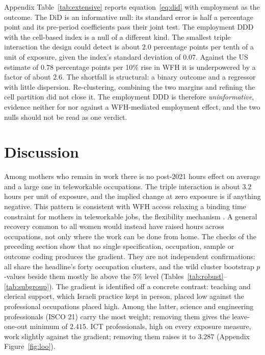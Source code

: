 \documentclass[12pt,a4paper]{article}
\begin{document}
Appendix Table~\ref{tab:extensive} reports equation~\eqref{eq:did} with employment as the outcome.
The DiD is an informative null: its standard error is half a percentage point and its pre-period
coefficients pass their joint test. The employment DDD with the cell-based index is a null of a
different kind. The smallest triple interaction the design could detect is about $2.0$ percentage
points per tenth of a unit of exposure, given the index's standard deviation of $0.07$. Against
the US estimate of $0.78$ percentage points per 10\% rise in WFH \citep{harrington2025} it is
underpowered by a factor of about $2.6$. The shortfall is structural: a binary outcome and a
regressor with little dispersion. Re-clustering, combining the two margins and refining the
cell partition did not close it. The employment DDD is therefore
\emph{uninformative}, evidence neither for nor against a WFH-mediated employment effect, and the
two nulls should not be read as one verdict.

\section{Discussion}\label{sec:discussion}

Among mothers who remain in work there is no post-2021 hours effect on average and a large one
in teleworkable occupations. The triple interaction is about $3.2$ hours per unit of exposure,
and the implied change at zero exposure is if anything negative. This pattern is consistent with
WFH access relaxing a binding time constraint for mothers in teleworkable jobs, the flexibility
mechanism \citep{goldin2014}. A general recovery common to all women would instead have raised
hours across occupations, not only where the work can be done from home. The checks of the
preceding section show that no single specification, occupation, sample or outcome coding
produces the gradient. They are not independent confirmations: all share the headline's forty
occupation clusters, and the wild cluster bootstrap $p$-values beside them mostly lie above the
5\% level (Tables~\ref{tab:robust}--\ref{tab:subgroup}). The gradient is identified off a
concrete contrast: teaching and clerical support, which Israeli practice kept in person, placed
low against the professional occupations placed high. Among the latter, science and engineering
professionals (ISCO 21) carry the most weight; removing them gives the leave-one-out minimum of
$2.415$. ICT professionals, high on every exposure measure, work slightly against the gradient;
removing them raises it to $3.287$ (Appendix Figure~\ref{fig:loo}).
\end{document}
